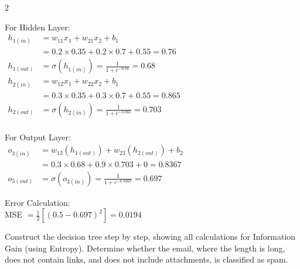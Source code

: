 \begin{multicols}{2}

For Hidden Layer:\\[0.5em]
$\begin{aligned}
   h_{1(in)} &= w_{11}x_1 + w_{21}x_2 + b_1\\
   &= 0.2 \times 0.35 + 0.2 \times 0.7 + 0.55 = 0.76\\
   h_{1(out)} &= \sigma(h_{1(in)}) = \frac{1}{1 + e^{-0.76}} = 0.68
   \\[1em]
   h_{2(in)} &= w_{12}x_1 + w_{22}x_2 + b_1\\
   &= 0.3 \times 0.35 + 0.3 \times 0.7 + 0.55 = 0.865\\
   h_{2(out)} &= \sigma(h_{2(in)}) = \frac{1}{1 + e^{-0.865}} = 0.703\\
\end{aligned}$


\vspace{1em}
For Output Layer:\\[0.5em]
$\begin{aligned}
   o_{3(in)} &= w_{13}(h_{1(out)}) + w_{23}(h_{2(out)}) + b_{2}\\
   &= 0.3 \times 0.68 + 0.9 \times 0.703 + 0 = 0.8367\\
   o_{3(out)} &= \sigma(o_{3(in)}) = \frac{1}{1 + e^{-0.8367}} = 0.697
\end{aligned}$

\vspace{1em}
Error Calculation:\\[0.5em]
MSE $= \frac{1}{2} \left[(0.5 - 0.697)^2\right]
= 0.0194$

Construct the decision tree step by step, showing all calculations for Information Gain (using Entropy). Determine whether the email, where the length is long, does not contain links, and does not include attachments, is classified as spam.


\end{multicols}
